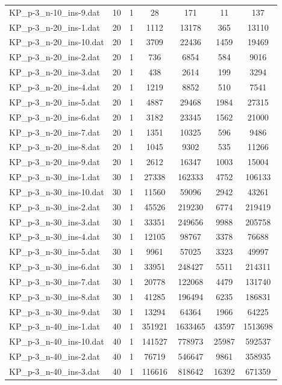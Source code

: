 \begin{table}[!ht]
\begin{tabular}{lcccccc}
KP\_p-3\_n-10\_ins-9.dat & 10 & 1 & 28 & 171 & 11 & 137 \\
KP\_p-3\_n-20\_ins-1.dat & 20 & 1 & 1112 & 13178 & 365 & 13110 \\
KP\_p-3\_n-20\_ins-10.dat & 20 & 1 & 3709 & 22436 & 1459 & 19469 \\
KP\_p-3\_n-20\_ins-2.dat & 20 & 1 & 736 & 6854 & 584 & 9016 \\
KP\_p-3\_n-20\_ins-3.dat & 20 & 1 & 438 & 2614 & 199 & 3294 \\
KP\_p-3\_n-20\_ins-4.dat & 20 & 1 & 1219 & 8852 & 510 & 7541 \\
KP\_p-3\_n-20\_ins-5.dat & 20 & 1 & 4887 & 29468 & 1984 & 27315 \\
KP\_p-3\_n-20\_ins-6.dat & 20 & 1 & 3182 & 23345 & 1562 & 21000 \\
KP\_p-3\_n-20\_ins-7.dat & 20 & 1 & 1351 & 10325 & 596 & 9486 \\
KP\_p-3\_n-20\_ins-8.dat & 20 & 1 & 1045 & 9302 & 535 & 11266 \\
KP\_p-3\_n-20\_ins-9.dat & 20 & 1 & 2612 & 16347 & 1003 & 15004 \\
KP\_p-3\_n-30\_ins-1.dat & 30 & 1 & 27338 & 162333 & 4752 & 106133 \\
KP\_p-3\_n-30\_ins-10.dat & 30 & 1 & 11560 & 59096 & 2942 & 43261 \\
KP\_p-3\_n-30\_ins-2.dat & 30 & 1 & 45526 & 219230 & 6774 & 219419 \\
KP\_p-3\_n-30\_ins-3.dat & 30 & 1 & 33351 & 249656 & 9988 & 205758 \\
KP\_p-3\_n-30\_ins-4.dat & 30 & 1 & 12105 & 98767 & 3378 & 76688 \\
KP\_p-3\_n-30\_ins-5.dat & 30 & 1 & 9961 & 57025 & 3323 & 49997 \\
KP\_p-3\_n-30\_ins-6.dat & 30 & 1 & 33951 & 248427 & 5511 & 214311 \\
KP\_p-3\_n-30\_ins-7.dat & 30 & 1 & 20778 & 122068 & 4479 & 131740 \\
KP\_p-3\_n-30\_ins-8.dat & 30 & 1 & 41285 & 196494 & 6235 & 186831 \\
KP\_p-3\_n-30\_ins-9.dat & 30 & 1 & 13294 & 64364 & 1966 & 64225 \\
KP\_p-3\_n-40\_ins-1.dat & 40 & 1 & 351921 & 1633465 & 43597 & 1513698 \\
KP\_p-3\_n-40\_ins-10.dat & 40 & 1 & 141527 & 778973 & 25987 & 592537 \\
KP\_p-3\_n-40\_ins-2.dat & 40 & 1 & 76719 & 546647 & 9861 & 358935 \\
KP\_p-3\_n-40\_ins-3.dat & 40 & 1 & 116616 & 818642 & 16392 & 671359 \\

\end{tabular}
\end{table}
